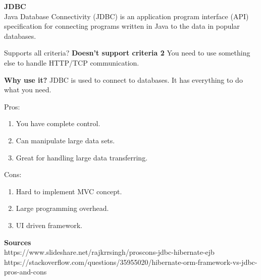 		\textbf{JDBC} \\
		Java Database Connectivity (JDBC) is an application program interface (API) specification for connecting programs written in Java to the data in popular databases.
		
		Supports all criteria?
		\textbf{Doesn't support criteria 2}
		You need to use something else to handle HTTP/TCP communication.
		
		\textbf{Why use it?}
		JDBC is used to connect to databases. It has everything to do what you need.
		
		Pros:
		\begin{enumerate}
			\item You have complete control.
			\item Can manipulate large data sets.
			\item Great for handling large data transferring.
		\end{enumerate}
		Cons:
		\begin{enumerate}
			\item Hard to implement MVC concept.
			\item Large programming overhead.
			\item UI driven framework.
		\end{enumerate}
	
	\textbf{Sources}\\
	https://www.slideshare.net/rajkrrsingh/proscons-jdbc-hibernate-ejb \\
	https://stackoverflow.com/questions/35955020/hibernate-orm-framework-vs-jdbc-pros-and-cons \\